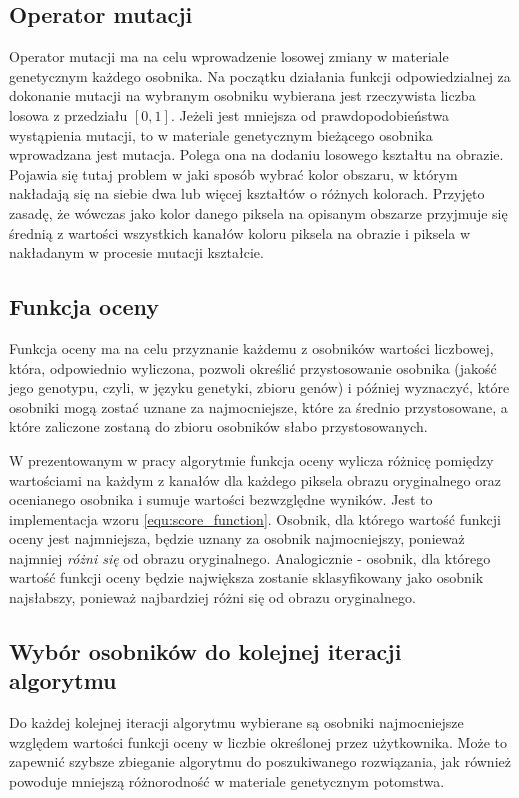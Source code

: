 \subsection{Operator mutacji}
Operator mutacji ma na celu wprowadzenie losowej zmiany w materiale genetycznym każdego osobnika. Na początku działania funkcji odpowiedzialnej za dokonanie mutacji na wybranym osobniku wybierana jest rzeczywista liczba losowa z przedziału $[0, 1]$. Jeżeli jest mniejsza od prawdopodobieństwa wystąpienia mutacji, to w materiale genetycznym bieżącego osobnika wprowadzana jest mutacja. Polega ona na dodaniu losowego kształtu na obrazie. Pojawia się tutaj problem w jaki sposób wybrać kolor obszaru, w którym nakładają się na siebie dwa lub więcej kształtów o różnych kolorach. Przyjęto zasadę, że wówczas jako kolor danego piksela na opisanym obszarze przyjmuje się średnią z wartości wszystkich kanałów koloru piksela na obrazie i piksela w nakładanym w procesie mutacji kształcie.

\subsection{Funkcja oceny}

Funkcja oceny ma na celu przyznanie każdemu z osobników wartości liczbowej, która, odpowiednio wyliczona, pozwoli określić przystosowanie osobnika (jakość jego genotypu, czyli, w języku genetyki, zbioru genów) i później wyznaczyć, które osobniki mogą zostać uznane za najmocniejsze, które za średnio przystosowane, a które zaliczone zostaną do zbioru osobników słabo przystosowanych. 

W prezentowanym w pracy algorytmie funkcja oceny wylicza różnicę pomiędzy wartościami na każdym z kanałów dla każdego piksela obrazu oryginalnego oraz ocenianego osobnika i sumuje wartości bezwzględne wyników. Jest to implementacja wzoru \ref{equ:score_function}. Osobnik, dla którego wartość funkcji oceny jest najmniejsza, będzie uznany za osobnik najmocniejszy, ponieważ najmniej \textit{różni się} od obrazu oryginalnego. Analogicznie - osobnik, dla którego wartość funkcji oceny będzie największa zostanie sklasyfikowany jako osobnik najsłabszy, ponieważ najbardziej różni się od obrazu oryginalnego.

\subsection{Wybór osobników do kolejnej iteracji algorytmu}
Do każdej kolejnej iteracji algorytmu wybierane są osobniki najmocniejsze względem wartości funkcji oceny w liczbie określonej przez użytkownika. Może to zapewnić szybsze zbieganie algorytmu do poszukiwanego rozwiązania, jak również powoduje mniejszą różnorodność w materiale genetycznym potomstwa.
